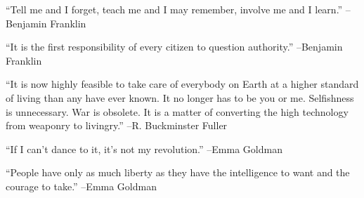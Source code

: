 \documentclass{article}%
\begin{document}
\vspace{1mm}%
\begin{minipage}{\textwidth}%
\flushleft%
“Tell me and I forget, teach me and I may remember, involve me and I learn.”%
\linebreak%
\vspace{1mm}%
–Benjamin Franklin%
\linebreak%
\vspace{1mm}%
\end{minipage}%
\linebreak%
\vspace{1mm}%
\begin{minipage}{\textwidth}%
\flushleft%
“It is the first responsibility of every citizen to question authority.”%
\linebreak%
\vspace{1mm}%
–Benjamin Franklin%
\linebreak%
\vspace{1mm}%
\end{minipage}%
\linebreak%
\vspace{1mm}%
\begin{minipage}{\textwidth}%
\flushleft%
“It is now highly feasible to take care of everybody on Earth at a higher standard of living than any have ever known. It no longer has to be you or me. Selfishness is unnecessary. War is obsolete. It is a matter of converting the high technology from weaponry to livingry.”%
\linebreak%
\vspace{1mm}%
–R. Buckminster Fuller%
\linebreak%
\vspace{1mm}%
\end{minipage}%
\linebreak%
\vspace{1mm}%
\begin{minipage}{\textwidth}%
\flushleft%
“If I can't dance to it, it's not my revolution.”%
\linebreak%
\vspace{1mm}%
–Emma Goldman%
\linebreak%
\vspace{1mm}%
\end{minipage}%
\linebreak%
\vspace{1mm}%
\begin{minipage}{\textwidth}%
\flushleft%
“People have only as much liberty as they have the intelligence to want and the courage to take.”%
\linebreak%
\vspace{1mm}%
–Emma Goldman%
\linebreak%
\vspace{1mm}%
\end{minipage}%
\end{document}

